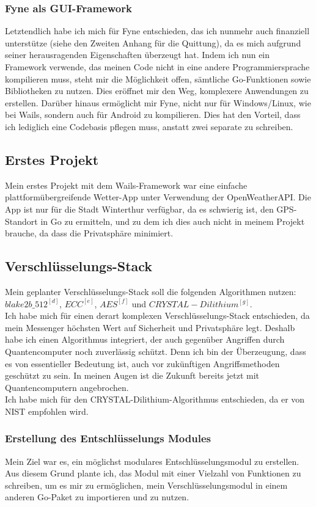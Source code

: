 \subsubsection{Fyne als GUI-Framework}
Letztendlich habe ich mich für Fyne \cite{fyne-web} entschieden, das ich nunmehr auch finanziell unterstütze (siehe den Zweiten Anhang für die Quittung), da es mich aufgrund seiner herausragenden Eigenschaften überzeugt hat. Indem ich nun ein Framework verwende, das meinen Code nicht in eine andere Programmiersprache kompilieren muss, steht mir die Möglichkeit offen, sämtliche Go-Funktionen sowie Bibliotheken zu nutzen. Dies eröffnet mir den Weg, komplexere Anwendungen zu erstellen. Darüber hinaus ermöglicht mir Fyne, nicht nur für Windows/Linux, wie bei Wails, sondern auch für Android zu kompilieren. Dies hat den Vorteil, dass ich lediglich eine Codebasis pflegen muss, anstatt zwei separate zu schreiben.
\subsection{Erstes Projekt}
Mein erstes Projekt mit dem Wails-Framework war eine einfache plattformübergreifende Wetter-App unter Verwendung der OpenWeatherAPI. Die App ist nur für die Stadt Winterthur verfügbar, da es schwierig ist, den GPS-Standort in Go zu ermitteln, und zu dem ich dies auch nicht in meinem Projekt brauche, da dass die Privatsphäre minimiert.
\subsection{Verschlüsselungs-Stack}
Mein geplanter Verschlüsselungs-Stack soll die folgenden Algorithmen nutzen: \hyperref[glo:blake]{\(blake2b\_512^{[d]}\)}, \hyperref[glo:ecc]{\(ECC^{[e]}\)}, \hyperref[glo:aes]{\(AES^{[f]}\)} und \hyperref[glo:crystal-dilithium]{\(CRYSTAL-Dilithium^{[g]}\)}. 
\\
Ich habe mich für einen derart komplexen Verschlüsselungs-Stack entschieden, da mein Messenger höchsten Wert auf Sicherheit und Privatsphäre legt. Deshalb habe ich einen Algorithmus integriert, der auch gegenüber Angriffen durch Quantencomputer noch zuverlässig schützt. Denn ich bin der Überzeugung, dass es von essentieller Bedeutung ist, auch vor zukünftigen Angriffsmethoden geschützt zu sein. In meinen Augen ist die Zukunft bereits jetzt mit Quantencomputern angebrochen.
\\
Ich habe mich für den CRYSTAL-Dilithium-Algorithmus entschieden, da er von NIST empfohlen wird. \cite{nist-recomedation}
\subsubsection{Erstellung des Entschlüsselungs Modules}
Mein Ziel war es, ein möglichst modulares Entschlüsselungsmodul zu erstellen. Aus diesem Grund plante ich, das Modul mit einer Vielzahl von Funktionen zu schreiben, um es mir zu ermöglichen, mein Verschlüsselungsmodul in einem anderen Go-Paket zu importieren und zu nutzen.
